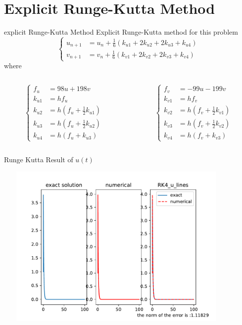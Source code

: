 \documentclass{beamer}
\begin{document}
 \section{Explicit Runge-Kutta Method}
 \begin{frame}{explicit Runge-Kutta Method}
    Explicit Runge-Kutta method for this problem 
    \[
        \begin{cases}
            u_{n+1} &= u_n +\frac{1}{6}(k_{u1}+2k_{u2}+2k_{u3}+k_{u4})\\
            v_{n+1} &= v_n +\frac{1}{6}(k_{v1}+2k_{v2}+2k_{v3}+k_{v4})
        \end{cases}
        \]
    where 
    \begin{columns}[T] %
        \begin{column}{.48\textwidth}
            \[
                \begin{cases}
                    f_u&=98u+198v\\
                    k_{u1}&=hf_u\\
                    k_{u2}&=h(f_u+\frac{1}{2}k_{u1})\\
                    k_{u3}&=h(f_u+\frac{1}{2}k_{u2})\\
                    k_{u4}&=h(f_u+k_{u3})
                \end{cases}
                \]
    
        \end{column}%
        \hfill%
        \begin{column}{.48\textwidth}
            \[
                \begin{cases}
                    f_v&=-99u-199v\\
                    k_{v1}&=hf_v\\
                    k_{v2}&=h(f_v+\frac{1}{2}k_{v1})\\
                    k_{v3}&=h(f_v+\frac{1}{2}k_{v2})\\
                    k_{v4}&=h(f_v+k_{v3})
                \end{cases}
                \]
        
        \end{column}
    \end{columns}
 \end{frame}
 \begin{frame}{Runge Kutta Result of $u(t)$}

    \centering
    \includegraphics[height=8cm,width=12cm]{RK4_u_lines.pdf}
 \end{frame}
\end{document}
